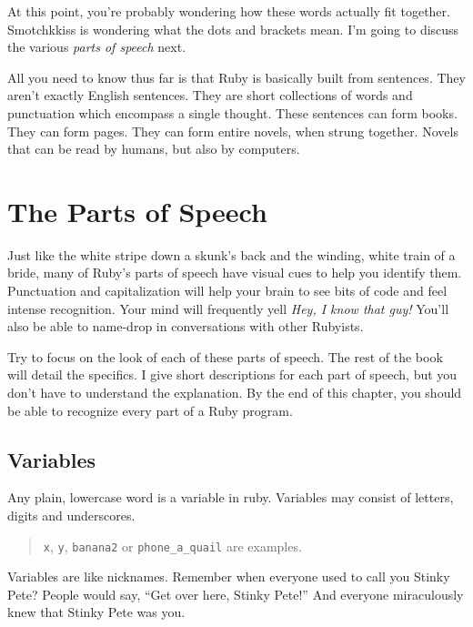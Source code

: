 \documentclass[10pt,twoside]{report}
\begin{document}
At this point, you're probably wondering how these words actually fit
together.  Smotchkkiss is wondering what the dots and brackets mean.
I'm going to discuss the various {\em parts of speech} next.

All you need to know thus far is that Ruby is basically built from
sentences.  They aren't exactly English sentences.  They are short
collections of words and punctuation which encompass a single thought.
These sentences can form books.  They can form pages.  They can form
entire novels, when strung together. Novels that can be read by
humans, but also by computers.


\section{The Parts of Speech}


Just like the white stripe down a skunk's back and the winding, white
train of a bride, many of Ruby's parts of speech have visual cues to
help you identify them.  Punctuation and capitalization will help your
brain to see bits of code and feel intense recognition. Your mind will
frequently yell {\em Hey, I know that guy!}  You'll also be able to
name-drop in conversations with other Rubyists.

Try to focus on the look of each of these parts of speech.  The rest
of the book will detail the specifics.  I give short descriptions for
each part of speech, but you don't have to understand the explanation.
By the end of this chapter, you should be able to recognize every part
of a Ruby program.



\subsection{Variables}



Any plain, lowercase word is a variable in ruby.  Variables may
consist of letters, digits and underscores.

\begin{quote}
\lstinline[breaklines=true]|x|, \lstinline[breaklines=true]|y|,
\lstinline[breaklines=true]|banana2| or
\lstinline[breaklines=true]|phone_a_quail| are examples.\end{quote}


Variables are like nicknames.  Remember when everyone used to call you
Stinky Pete? People would say, ``Get over here, Stinky Pete!''  And
everyone miraculously knew that Stinky Pete was you.
\end{document}
